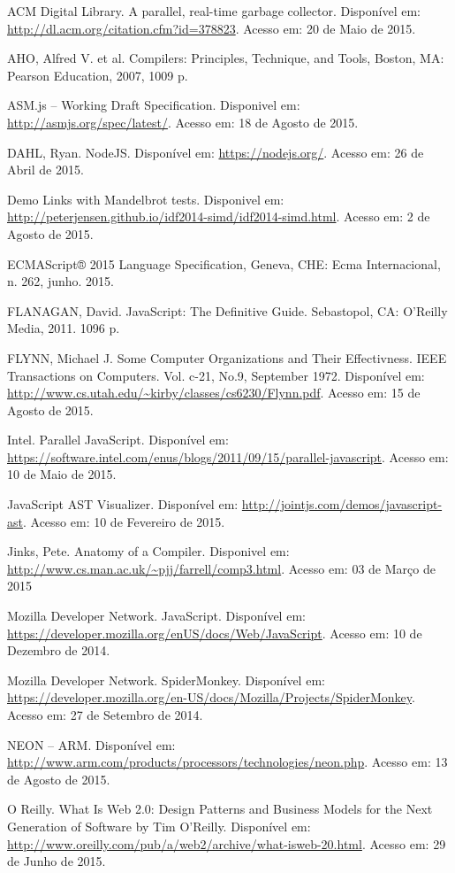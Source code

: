 \documentclass{article}
\begin{document}
ACM Digital Library. A parallel, real-time garbage collector.
Disponível em: \url{http://dl.acm.org/citation.cfm?id=378823}.
Acesso em: 20 de Maio de 2015.

AHO, Alfred V. et al. Compilers: Principles, Technique, and Tools, Boston, MA: Pearson Education, 2007, 1009 p.

ASM.js – Working Draft Specification.
Disponivel em: \url{http://asmjs.org/spec/latest/}.
Acesso em: 18 de Agosto de 2015.

DAHL, Ryan. NodeJS.
Disponível em: \url{https://nodejs.org/}.
Acesso em: 26 de Abril de 2015.

Demo Links with Mandelbrot tests.
Disponivel em: \url{http://peterjensen.github.io/idf2014-simd/idf2014-simd.html}.
Acesso em: 2 de Agosto de 2015.

ECMAScript® 2015 Language Specification, Geneva, CHE: Ecma Internacional, n. 262, junho. 2015.

FLANAGAN, David. JavaScript: The Definitive Guide. Sebastopol, CA: O'Reilly Media, 2011. 1096 p.

FLYNN, Michael J. Some Computer Organizations and Their Effectivness. IEEE Transactions on Computers. Vol. c-21, No.9, September 1972.
Disponível em: \url{http://www.cs.utah.edu/~kirby/classes/cs6230/Flynn.pdf}.
Acesso em: 15 de Agosto de 2015.

Intel. Parallel JavaScript.
Disponível em: \url{https://software.intel.com/enus/blogs/2011/09/15/parallel-javascript}.
Acesso em: 10 de Maio de 2015.

JavaScript AST Visualizer.
Disponível em: \url{http://jointjs.com/demos/javascript-ast}.
Acesso em: 10 de Fevereiro de 2015.

Jinks, Pete. Anatomy of a Compiler.
Disponivel em: \url{http://www.cs.man.ac.uk/~pjj/farrell/comp3.html}.
Acesso em: 03 de Março de 2015

Mozilla Developer Network. JavaScript.
Disponível em: \url{https://developer.mozilla.org/enUS/docs/Web/JavaScript}.
Acesso em: 10 de Dezembro de 2014.

Mozilla Developer Network. SpiderMonkey.
Disponível em: \url{https://developer.mozilla.org/en-US/docs/Mozilla/Projects/SpiderMonkey}.
Acesso em: 27 de Setembro de 2014.

NEON – ARM.
Disponível em: \url{http://www.arm.com/products/processors/technologies/neon.php}.
Acesso em: 13 de Agosto de 2015.

O Reilly. What Is Web 2.0: Design Patterns and Business Models for the Next Generation of Software by Tim O'Reilly.
Disponível em: \url{http://www.oreilly.com/pub/a/web2/archive/what-isweb-20.html}.
Acesso em: 29 de Junho de 2015.
\end{document}
